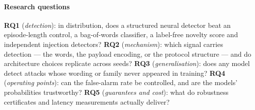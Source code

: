 \documentclass[conference,compsoc]{IEEEtran}
\newcommand{\RQ}[1]{\textbf{RQ#1}}
\begin{document}
\paragraph{Research questions} \RQ{1} (\emph{detection}): in distribution, does a structured neural detector beat an episode-length control, a bag-of-words classifier, a label-free novelty score and independent injection detectors? \RQ{2} (\emph{mechanism}): which signal carries detection --- the words, the payload encoding, or the protocol structure --- and do architecture choices replicate across seeds? \RQ{3} (\emph{generalisation}): does any model detect attacks whose wording or family never appeared in training? \RQ{4} (\emph{operating points}): can the false-alarm rate be controlled, and are the models' probabilities trustworthy? \RQ{5} (\emph{guarantees and cost}): what do robustness certificates and latency measurements actually deliver?
\end{document}
